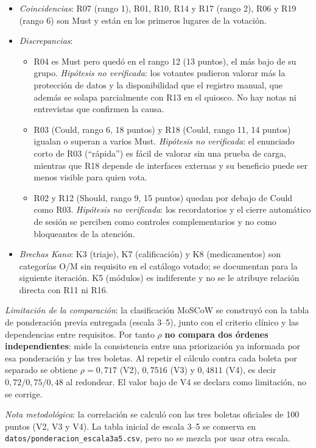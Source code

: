 \begin{itemize}
  \item \emph{Coincidencias}: R07 (rango 1), R01, R10, R14 y R17 (rango 2), R06 y R19 (rango 6) son Must y están en los primeros lugares de la votación.
  \item \emph{Discrepancias}:
  \begin{itemize}
    \item R04 es Must pero quedó en el rango 12 (13 puntos), el más bajo de su grupo. \emph{Hipótesis no verificada}: los votantes pudieron valorar más la protección de datos y la disponibilidad que el registro manual, que además se solapa parcialmente con R13 en el quiosco. No hay notas ni entrevistas que confirmen la causa.
    \item R03 (Could, rango 6, 18 puntos) y R18 (Could, rango 11, 14 puntos) igualan o superan a varios Must. \emph{Hipótesis no verificada}: el enunciado corto de R03 (``rápida'') es fácil de valorar sin una prueba de carga, mientras que R18 depende de interfaces externas y su beneficio puede ser menos visible para quien vota.
    \item R02 y R12 (Should, rango 9, 15 puntos) quedan por debajo de Could como R03. \emph{Hipótesis no verificada}: los recordatorios y el cierre automático de sesión se perciben como controles complementarios y no como bloqueantes de la atención.
  \end{itemize}
  \item \emph{Brechas Kano}: K3 (triaje), K7 (calificación) y K8 (medicamentos) son categorías O/M sin requisito en el catálogo votado; se documentan para la siguiente iteración. K5 (módulos) es indiferente y no se le atribuye relación directa con R11 ni R16.
\end{itemize}

\emph{Limitación de la comparación}: la clasificación MoSCoW se construyó con la tabla de ponderación previa entregada (escala 3--5), junto con el criterio clínico y las dependencias entre requisitos. Por tanto $\rho$ \textbf{no compara dos órdenes independientes}: mide la consistencia entre una priorización ya informada por esa ponderación y las tres boletas. Al repetir el cálculo contra cada boleta por separado se obtiene $\rho = 0{,}717$ (V2), $0{,}7516$ (V3) y $0{,}4811$ (V4), es decir $0{,}72 / 0{,}75 / 0{,}48$ al redondear. El valor bajo de V4 se declara como limitación, no se corrige.

\emph{Nota metodológica}: la correlación se calculó con las tres boletas oficiales de 100 puntos (V2, V3 y V4). La tabla inicial de escala 3--5 se conserva en \texttt{datos/ponderacion\_escala3a5.csv}, pero no se mezcla por usar otra escala.
